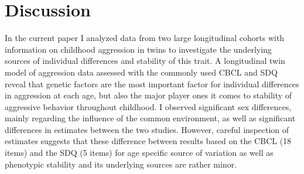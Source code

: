 ﻿\section{Discussion}

In the current paper I analyzed data from two large longitudinal cohorts with information on childhood aggression in twins to investigate the underlying sources of individual differences and stability of this trait.
A longitudinal twin model of aggression data assessed with the commonly used CBCL and SDQ reveal that genetic factors are the most important factor for individual differences in aggression at each age, but also the major player ones it comes to stability of aggressive behavior throughout childhood.
I observed significant sex differences, mainly regarding the influence of the common environment, as well as significant differences in estimates between the two studies.
However, careful inspection of estimates suggests that these difference between results based on the CBCL (18 items) and the SDQ (5 items) for age specific source of variation as well as phenotypic stability and its underlying sources are rather minor. 

